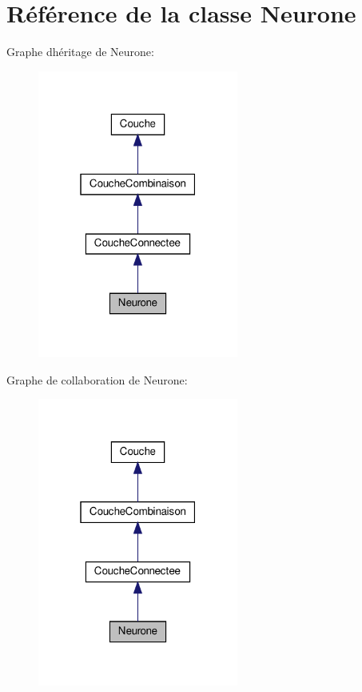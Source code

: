 \hypertarget{class_neurone}{}\section{Référence de la classe Neurone}
\label{class_neurone}


Graphe d\textquotesingle{}héritage de Neurone\+:\nopagebreak
\begin{figure}[H]
\begin{center}
\leavevmode
\includegraphics[width=187pt]{class_neurone__inherit__graph}
\end{center}
\end{figure}


Graphe de collaboration de Neurone\+:\nopagebreak
\begin{figure}[H]
\begin{center}
\leavevmode
\includegraphics[width=187pt]{class_neurone__coll__graph}
\end{center}
\end{figure}
